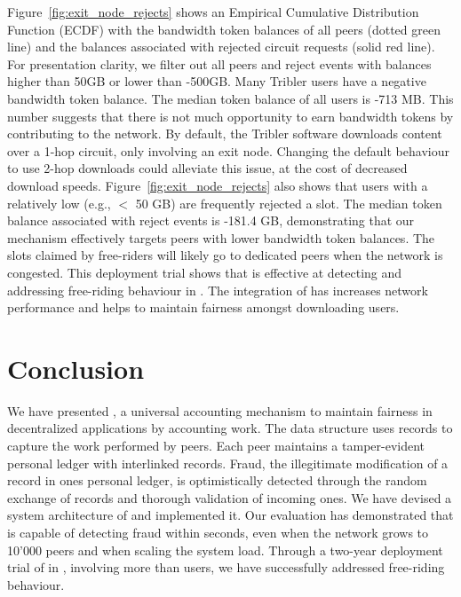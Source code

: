 Figure~\ref{fig:exit_node_rejects} shows an Empirical Cumulative Distribution Function (ECDF) with the bandwidth token balances of all peers (dotted green line) and the balances associated with rejected circuit requests (solid red line).
For presentation clarity, we filter out all peers and reject events with balances higher than 50GB or lower than -500GB.
Many Tribler users have a negative bandwidth token balance.
The median token balance of all users is -713 MB.
This number suggests that there is not much opportunity to earn bandwidth tokens by contributing to the network.
By default, the Tribler software downloads content over a 1-hop circuit, only involving an exit node.
Changing the default behaviour to use 2-hop downloads could alleviate this issue, at the cost of decreased download speeds.
Figure~\ref{fig:exit_node_rejects} also shows that users with a relatively low (e.g., $ < $ 50 GB) are frequently rejected a slot.
The median token balance associated with reject events is -181.4 GB, demonstrating that our mechanism effectively targets peers with lower bandwidth token balances.
The slots claimed by free-riders will likely go to dedicated peers when the network is congested.
This deployment trial shows that \ModelName{} is effective at detecting and addressing free-riding behaviour in \Tribler{}.
The integration of \ModelName{} has increases network performance and helps to maintain fairness amongst downloading users.



\section{Conclusion}
We have presented \ModelName{}, a universal accounting mechanism to maintain fairness in decentralized applications by accounting work.
The \ModelName{} data structure uses records to capture the work performed by peers.
Each peer maintains a tamper-evident personal ledger with interlinked records.
Fraud, the illegitimate modification of a record in ones personal ledger, is optimistically detected through the random exchange of records and thorough validation of incoming ones.
We have devised a system architecture of \ModelName{} and implemented it.
Our evaluation has demonstrated that \ModelName{} is capable of detecting fraud within seconds, even when the network grows to 10'000 peers and when scaling the system load.
Through a two-year deployment trial of \ModelName{} in \Tribler{}, involving more than \TrialUsers{} users, we have successfully addressed free-riding behaviour.

